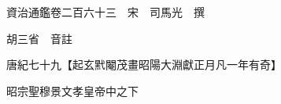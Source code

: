 










 


 
 


 

  
  
  
  
  





  
  
  
  
  
 
  

  

  
  
  



  

 
 

  
   




  

  
  


  　　資治通鑑卷二百六十三　宋　司馬光　撰

　　胡三省　音註

　　唐紀七十九【起玄黓閹茂畫昭陽大淵獻正月凡一年有奇】

　　昭宗聖穆景文孝皇帝中之下

